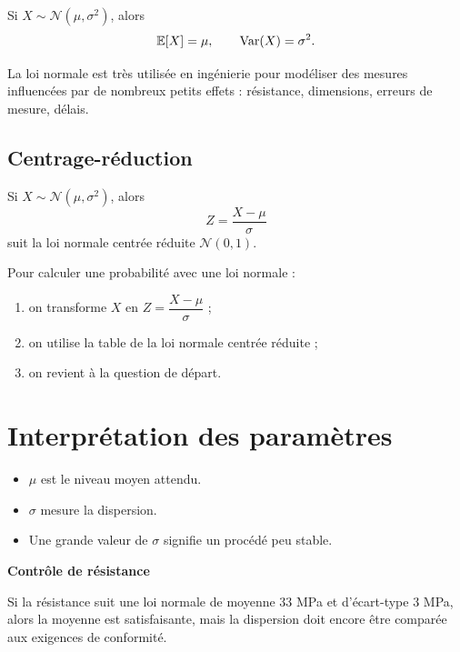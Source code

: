 \begin{Prop}
Si $X\sim \mathcal{N}(\mu,\sigma^2)$, alors
$$
\mathbb{E}[X]=\mu,
\qquad
\operatorname{Var}(X)=\sigma^2.
$$
\end{Prop}

\begin{Rmq}
La loi normale est très utilisée en ingénierie pour modéliser des mesures influencées par de nombreux petits effets : résistance, dimensions, erreurs de mesure, délais.
\end{Rmq}

\subsection{Centrage-réduction}

\begin{Prop}
Si $X\sim \mathcal{N}(\mu,\sigma^2)$, alors
$$
Z=\frac{X-\mu}{\sigma}
$$
suit la loi normale centrée réduite $\mathcal{N}(0,1)$.
\end{Prop}

\begin{Meth}
Pour calculer une probabilité avec une loi normale :
\begin{enumerate}
    \item on transforme $X$ en $Z=\dfrac{X-\mu}{\sigma}$ ;
    \item on utilise la table de la loi normale centrée réduite ;
    \item on revient à la question de départ.
\end{enumerate}
\end{Meth}

\section{Interprétation des paramètres}

\begin{itemize}
    \item $\mu$ est le niveau moyen attendu.
    \item $\sigma$ mesure la dispersion.
    \item Une grande valeur de $\sigma$ signifie un procédé peu stable.
\end{itemize}

\begin{Ex}
\textbf{Contrôle de résistance}

Si la résistance suit une loi normale de moyenne $33$ MPa et d'écart-type $3$ MPa, alors la moyenne est satisfaisante, mais la dispersion doit encore être comparée aux exigences de conformité.
\end{Ex}

